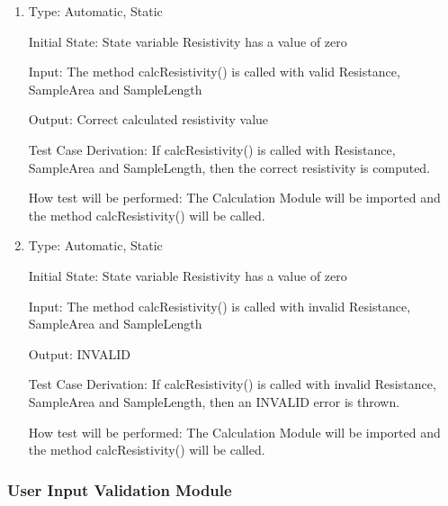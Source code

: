\documentclass[12pt, titlepage]{article}
\begin{document}
\begin{enumerate}[{UT-C}1.]
  \item
  
  Type: Automatic, Static 

  Initial State: State variable Resistivity has a value of zero

  Input: The method calcResistivity() is called with valid Resistance, SampleArea and SampleLength

  Output: Correct calculated resistivity value

  Test Case Derivation: If calcResistivity() is called with Resistance, SampleArea and SampleLength, then the correct resistivity is computed.

  How test will be performed: The Calculation Module will be imported and the method calcResistivity() will be called. 

  \item
  
  Type: Automatic, Static 

  Initial State: State variable Resistivity has a value of zero

  Input: The method calcResistivity() is called with invalid Resistance, SampleArea and SampleLength

  Output: INVALID

  Test Case Derivation: If calcResistivity() is called with invalid Resistance, SampleArea and SampleLength, then an INVALID error is thrown.

  How test will be performed: The Calculation Module will be imported and the method calcResistivity() will be called. 
      
  \end{enumerate}


  \subsubsection{User Input Validation Module }
\end{document}
